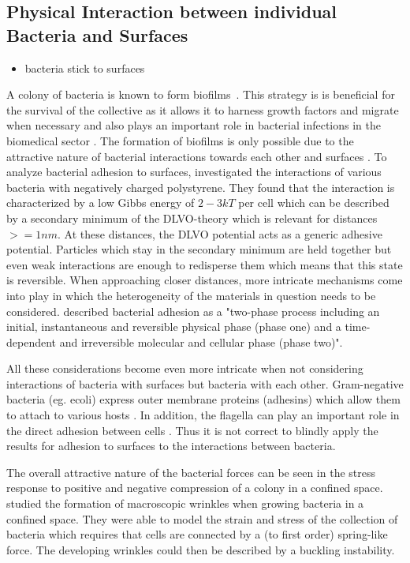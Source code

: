 \documentclass{article}
\begin{document}
\subsection{Physical Interaction between individual Bacteria and Surfaces}

\begin{itemize}
    \item \cite{BrettFinlay2014} bacteria stick to surfaces
\end{itemize}

A colony of bacteria is known to form biofilms~\cite{Dunne2002}.
This strategy is is beneficial for the survival of the collective as it allows it to harness growth
factors and migrate when necessary and also plays an important role in bacterial infections in the
biomedical sector \cite{Ong1999}.
The formation of biofilms is only possible due to the attractive nature of bacterial interactions
towards each other and surfaces \cite{Berne2018}.
To analyze bacterial adhesion to surfaces, \cite{vanLoosdrecht1989} investigated the interactions of
various bacteria with negatively charged polystyrene.
They found that the interaction is characterized by a low Gibbs energy of
$2-3kT$ per cell which can be described by a secondary minimum of the DLVO-theory
\cite{Derjaguin1993,Verwey1947} which is relevant for distances $>=1nm$.
At these distances, the DLVO potential acts as a generic adhesive potential.
Particles which stay in the secondary minimum are held together but even weak interactions are
enough to redisperse them which means that this state is reversible.
When approaching closer distances, more intricate mechanisms come into play in which the
heterogeneity of the materials in question needs to be considered.
\cite{Hori2010} described bacterial adhesion as a "two-phase process including an initial, instantaneous
and reversible physical phase (phase one) and a time-dependent and irreversible molecular and
cellular phase (phase two)".

All these considerations become even more intricate when not considering interactions of bacteria
with surfaces but bacteria with each other.
Gram-negative bacteria (eg. \ac{ecoli}) express outer membrane proteins (adhesins) which allow them
to attach to various hosts \cite{Vaca2019,Beachey1981}.
In addition, the flagella can play an important role in the direct adhesion between cells
\cite{Haiko2013}.
Thus it is not correct to blindly apply the results for adhesion to surfaces to the interactions
between bacteria.

The overall attractive nature of the bacterial forces can be seen in the stress response to positive
and negative compression of a colony in a confined space.
\cite{Trejo2013} studied the formation of macroscopic wrinkles when growing bacteria in a confined
space.
They were able to model the strain and stress of the collection of bacteria which requires that
cells are connected by a (to first order) spring-like force.
The developing wrinkles could then be described by a buckling instability.
\end{document}
